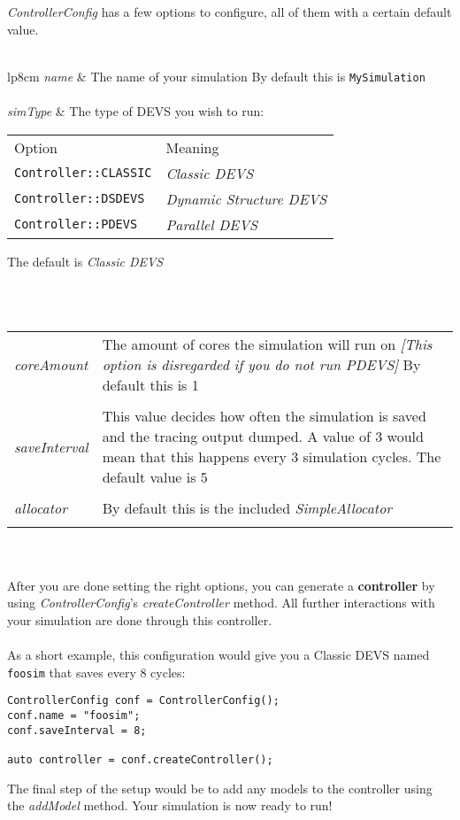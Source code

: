 \textsl{ControllerConfig} has a few options to configure, all of them with a certain default value.
\\\\
\begin{tabular}{lp{8cm}}
\textit{name} & The name of your simulation \newline
				By default this is \texttt{MySimulation}
\\\\
\textit{simType} & The type of DEVS you wish to run:

	\begin{tabular}{l|l}
	\textsf{Option} & \textsf{Meaning} \\
	\texttt{Controller::CLASSIC} & \emph{Classic DEVS} \\
	\texttt{Controller::DSDEVS} & \emph{Dynamic Structure DEVS} \\
	\texttt{Controller::PDEVS} & \emph{Parallel DEVS} \\
	\end{tabular} \newline
	
	The default is \emph{Classic DEVS}
\\\\
\end{tabular}
\\
\begin{tabular}{lp{8cm}}
\textit{coreAmount} & The amount of cores the simulation will run on \newline
						\textit{[This option is disregarded if you do not run PDEVS]} \newline
						By default this is 1
\\\\
\textit{saveInterval} & This value decides how often the simulation is saved and the tracing output dumped. A value of 3 would mean that this happens every 3 simulation cycles. \newline
						The default value is 5
\\\\
\textit{allocator} & By default this is the included \textsl{SimpleAllocator}
\\\\
\end{tabular}\\
\\
After you are done setting the right options, you can generate a \textbf{controller} by using \textsl{ControllerConfig}'s \textsl{createController} method. All further interactions with your simulation are done through this controller.\\
\\
As a short example, this configuration would give you a Classic DEVS named \texttt{foosim} that saves every 8 cycles:
\begin{verbatim}
ControllerConfig conf = ControllerConfig();
conf.name = "foosim";
conf.saveInterval = 8;

auto controller = conf.createController();
\end{verbatim}
The final step of the setup would be to add any models to the controller using the \textsl{addModel} method. Your simulation is now ready to run!

